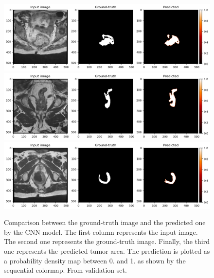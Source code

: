 \documentclass{standalone}
\begin{document}
\begin{figure}[htp]

    \centering
    \includegraphics[width=\textwidth]{../images/predoutput2.png}
    \includegraphics[width=\textwidth]{../images/predoutput.png}
    \includegraphics[width=\textwidth]{../images/predoutput1.png}
    

    \caption{Comparison between the ground-truth image and the predicted one by the CNN model. The first column represents the input image. 
    The second one represents the ground-truth image. 
    Finally, the third one represents the predicted tumor area.
    The prediction is plotted as a probability density map between 0. and 1. as shown by the sequential colormap.
    From validation set.}\label{predvalidation}

\end{figure}
\end{document}
